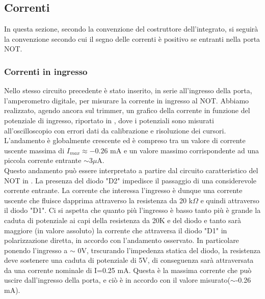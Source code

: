 \subsection{Correnti}
In questa sezione, secondo la convenzione del costruttore dell'integrato, si seguirà la convenzione secondo cui il segno delle correnti è positivo se entranti nella porta NOT.\\
\subsubsection{Correnti in ingresso}
Nello stesso circuito precedente è stato inserito, in serie all'ingresso della porta, l'amperometro digitale, per misurare la corrente in ingresso al NOT.
Abbiamo realizzato, agendo ancora sul trimmer, un grafico della corrente in funzione del potenziale di ingresso, riportato in , dove i potenziali sono misurati all'oscilloscopio con errori dati da calibrazione e risoluzione dei cursori.\\
L'andamento è globalmente crescente  ed è  compreso tra un valore di corrente uscente massima di $I_{max}\approx -0.26$ mA e un valore massimo corrispondente ad una piccola corrente entrante $\sim 3 \mu$A. \\
Questo andamento può essere interpretato a partire dal circuito caratteristico del NOT in . La presenza del diodo "D2" impedisce il passaggio di una considerevole corrente entrante. La corrente che interessa l'ingresso è dunque una corrente uscente che fluisce dapprima attraverso la resistenza da 20 k$\Omega$ e quindi attraverso il diodo "D1". Ci si aspetta che quanto più l'ingresso è basso tanto più è grande la caduta di potenziale ai capi della resistenza da 20K e del diodo e tanto sarà maggiore (in valore assoluto) la corrente che attraversa il diodo "D1" in polarizzazione diretta, in accordo con l'andamento osservato. In particolare ponendo l'ingresso a $\sim$ 0V, trscurando l'impedenza statica del diodo, la resistenza deve sostenere una caduta di potenziale di 5V, di conseguenza sarà attraversata da una corrente nominale di I=0.25 mA. Questa è la massima corrente che può uscire dall'ingresso della porta, e ciò è in accordo con il valore misurato($\sim$-0.26 mA).\\
